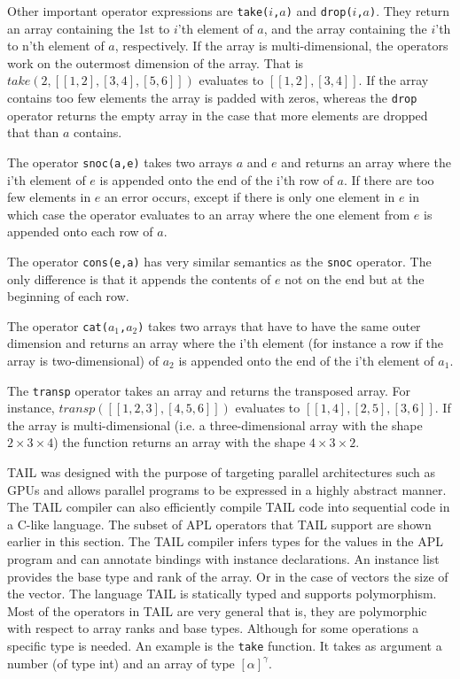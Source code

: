 \documentclass[11pt]{article}
\begin{document}
Other important operator expressions are {\tt take($i$,$a$)} and {\tt drop($i$,$a$)}.
They return an array containing the 1st to $i$'th element of $a$,
and the array containing the $i$'th to n'th element of $a$, respectively.
If the array is multi-dimensional, the operators work on the outermost dimension of the array. That is $take(2,[[1,2],[3,4],[5,6]])$ evaluates to $[[1,2],[3,4]]$.
If the array contains too few elements the array is padded with zeros,
whereas the {\tt drop} operator returns the empty array in the case that more elements are dropped that than $a$ contains. 

The operator {\tt snoc(a,e)} takes two arrays $a$ and $e$ and returns an array where the i'th element of $e$ is appended onto the end of the i'th row of $a$.
If there are too few elements in $e$ an error occurs,
except if there is only one element in $e$ in which case the operator evaluates to an array where the one element from $e$
is appended onto each row of $a$.

The operator {\tt cons(e,a)} has very similar semantics as the {\tt snoc} operator.
The only difference is that it appends the contents of $e$ not on the end but at the beginning of each row.

The operator {\tt cat($a_1$,$a_2$)} takes two arrays that have to have the same outer dimension and returns an array where the i'th element (for instance a row if the array is two-dimensional) of $a_2$ is appended onto the end of the i'th element of $a_1$.

The {\tt transp} operator takes an array and returns the transposed array. For instance,
 $transp([[1,2,3],[4,5,6]])$ evaluates to $[[1,4],[2,5],[3,6]]$.
If the array is multi-dimensional (i.e. a three-dimensional array with the shape $2\times3\times4$) the function returns an array with the shape $4\times3\times2$.

TAIL was designed with the purpose of targeting parallel architectures such as GPUs and allows parallel programs to be
expressed in a highly abstract manner.
The TAIL compiler can also efficiently compile TAIL code into sequential code in a C-like language.
The subset of APL operators that TAIL support are shown earlier in this section.
The TAIL compiler infers types for the values in the APL program and can annotate bindings with
instance declarations. An instance list provides the base type and rank of the array. Or in
the case of vectors the size of the vector.
The language TAIL is statically typed and supports polymorphism. 
Most of the operators in TAIL are very general that is, they are polymorphic with respect to array ranks and base types.
Although for some operations a specific type is needed.
An example is the {\tt take} function. It takes as argument a number (of type int) and an array of type $[\alpha]^\gamma$.
\end{document}
